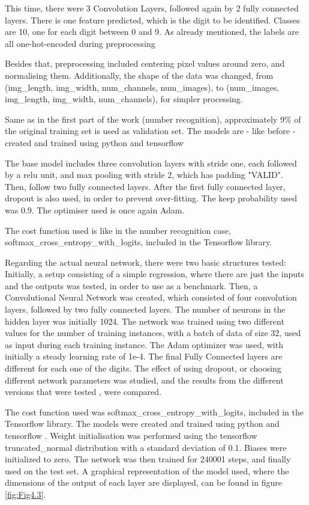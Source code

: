 \documentclass[final,12p,times]{elsarticle}
\begin{document}
\begin{Itemize}
This time, there were 3 Convolution Layers, followed again by 2 fully connected layers.
There is one feature predicted, which is the digit to be identified.
Classes are 10, one for each digit between 0 and 9.
As already mentioned, the labels are all one-hot-encoded during preprocessing

Besides that, preprocessing included centering pixel values around zero, and normalising them.
Additionally, the shape of the data was changed, from (img_length, img_width, num_channels, num_images), to 
(num_images, img_length, img_width, num_channels), for simpler processing.

Same as in the first part of the work (number recognition), approximately 9\% of the original training set is used as 
validation set.
The models are - like before - created and trained using python \cite{python} and tensorflow \cite{45166}

The base model includes three convolution layers with stride one, each followed by a relu unit, and max pooling with stride 2, 
which has padding "VALID".
Then, follow two fully connected layers.
After the first fully connected layer, dropout \cite{Srivastava2014} is also used, in order to prevent over-fitting.
The keep probability used was 0.9.
The optimiser used is once again Adam.


The cost function used is like in the number recognition case,  softmax\_cross\_entropy\_with\_logits, included in the 
Tensorflow library.


Regarding the actual neural network, there were two basic structures tested:
Initially, a setup consisting of a simple regression, where there are just the inputs and the outputs was tested, in order to use as a benchmark.
Then, a Convolutional Neural Network was created, which consisted of four convolution layers, followed by two fully connected layers.
The number of neurons in the hidden layer was initially 1024.
The network was trained using two different values for the number of training instances, with a batch of data of size 32, used as input during each training instance.
The Adam optimizer was used, with initially a steady learning rate of 1e-4.
The final Fully Connected layers are different for each one of the digits.
The effect of using dropout, or choosing different network parameters was studied, and the results from the different versions that were tested , were compared.

The cost function used was softmax\_cross\_entropy\_with\_logits, included in the Tensorflow library.
The models were created and trained using python \cite{python} and tensorflow \cite{45166}.
Weight initialisation was performed using the tensorflow truncated\_normal distribution with a standard deviation of 0.1.
Biases were initialized to zero.
The network was then trained for 240001 steps, and finally used on the test set.
A graphical representation of the model used, where the dimensions of the output of each layer are displayed, can be found in 
figure \ref{fig:Fig4.3}.


\end{Itemize}
\end{document}
